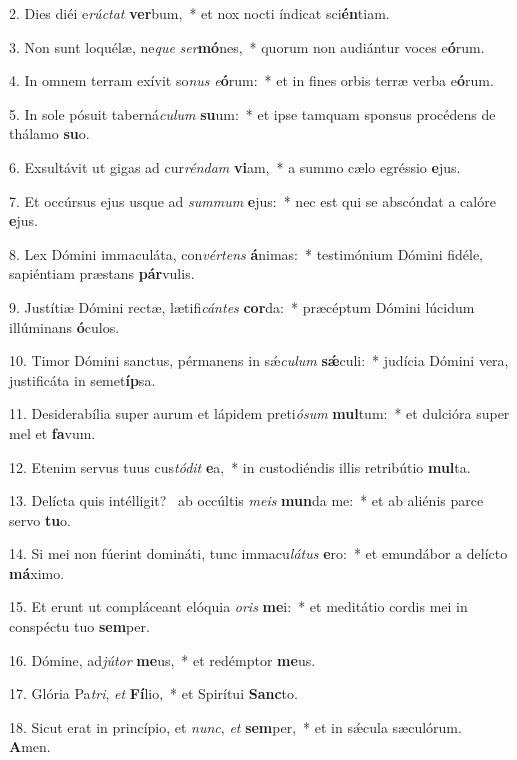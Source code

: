 2. Dies diéi e\textit{rúc}\textit{tat} \textbf{ver}bum,~*  et nox nocti índicat sci\textbf{én}tiam.\

3. Non sunt loquélæ, ne\textit{que} \textit{ser}\textbf{mó}nes,~*  quorum non audiántur voces e\textbf{ó}rum.\

4. In omnem terram exívit so\textit{nus} \textit{e}\textbf{ó}rum:~*  et in fines orbis terræ verba e\textbf{ó}rum.\

5. In sole pósuit taberná\textit{cu}\textit{lum} \textbf{su}um:~*  et ipse tamquam sponsus procédens de thálamo \textbf{su}o.\

6. Exsultávit ut gigas ad cur\textit{rén}\textit{dam} \textbf{vi}am,~*  a summo cælo egréssio \textbf{e}jus.\

7. Et occúrsus ejus usque ad \textit{sum}\textit{mum} \textbf{e}jus:~*  nec est qui se abscóndat a calóre \textbf{e}jus.\

8. Lex Dómini immaculáta, con\textit{vér}\textit{tens} \textbf{á}nimas:~*  testimónium Dómini fidéle, sapiéntiam præstans \textbf{pár}vulis.\

9. Justítiæ Dómini rectæ, lætifi\textit{cán}\textit{tes} \textbf{cor}da:~*  præcéptum Dómini lúcidum illúminans \textbf{ó}culos.\

10. Timor Dómini sanctus, pérmanens in sǽ\textit{cu}\textit{lum} \textbf{sǽ}culi:~*  judícia Dómini vera, justificáta in semet\textbf{íp}sa.\

11. Desiderabília super aurum et lápidem preti\textit{ó}\textit{sum} \textbf{mul}tum:~*  et dulcióra super mel et \textbf{fa}vum.\

12. Etenim servus tuus cus\textit{tó}\textit{dit} \textbf{e}a,~*  in custodiéndis illis retribútio \textbf{mul}ta.\

13. Delícta quis intélligit? \dag\  ab occúltis \textit{me}\textit{is} \textbf{mun}da me:~*  et ab aliénis parce servo \textbf{tu}o.\

14. Si mei non fúerint domináti, tunc immacu\textit{lá}\textit{tus} \textbf{e}ro:~*  et emundábor a delícto \textbf{má}ximo.\

15. Et erunt ut compláceant elóquia \textit{o}\textit{ris} \textbf{me}i:~*  et meditátio cordis mei in conspéctu tuo \textbf{sem}per.\

16. Dómine, ad\textit{jú}\textit{tor} \textbf{me}us,~*  et redémptor \textbf{me}us.\

17. Glória Pa\textit{tri}, \textit{et} \textbf{Fí}lio,~*  et Spirítui \textbf{Sanc}to.\

18. Sicut erat in princípio, et \textit{nunc}, \textit{et} \textbf{sem}per,~*  et in sǽcula sæculórum. \textbf{A}men.\

